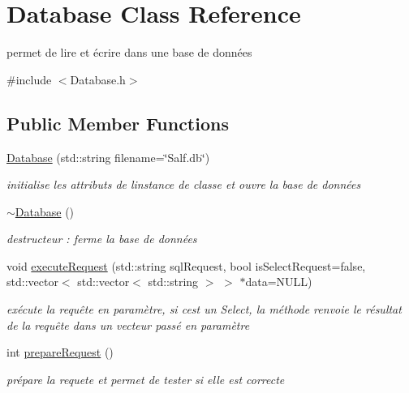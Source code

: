\hypertarget{class_database}{}\section{Database Class Reference}
\label{class_database}


permet de lire et écrire dans une base de données  




{\ttfamily \#include $<$Database.\+h$>$}

\subsection*{Public Member Functions}
\begin{DoxyCompactItemize}
\item 
\hyperlink{class_database_ae6cc395486dbff94bb4e2af329d150ac}{Database} (std\+::string filename=\char`\"{}Salf.\+db\char`\"{})
\begin{DoxyCompactList}\small\item\em initialise les attributs de l\textquotesingle{}instance de classe et ouvre la base de données \end{DoxyCompactList}\item 
\hyperlink{class_database_a84d399a2ad58d69daab9b05330e1316d}{$\sim$\+Database} ()
\begin{DoxyCompactList}\small\item\em destructeur \+: ferme la base de données \end{DoxyCompactList}\item 
void \hyperlink{class_database_abbcb06c60168be70c736564c4b78747f}{execute\+Request} (std\+::string sql\+Request, bool is\+Select\+Request=false, std\+::vector$<$ std\+::vector$<$ std\+::string $>$ $>$ $\ast$data=N\+U\+LL)
\begin{DoxyCompactList}\small\item\em exécute la requête en paramètre, si c\textquotesingle{}est un Select, la méthode renvoie le résultat de la requête dans un vecteur passé en paramètre \end{DoxyCompactList}\item 
int \hyperlink{class_database_a307a7ba9ab4fcb42ccdbe7a1d6c75cf8}{prepare\+Request} ()
\begin{DoxyCompactList}\small\item\em prépare la requete et permet de tester si elle est correcte \end{DoxyCompactList}\end{DoxyCompactItemize}


